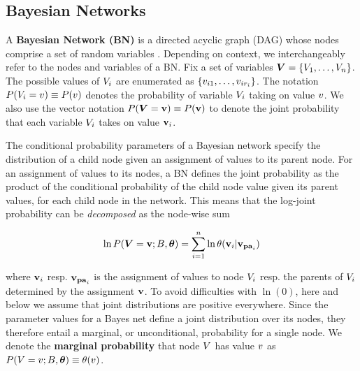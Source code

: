 \documentclass[conference]{IEEEtran}
\begin{document}
 
\subsection{Bayesian Networks}

A {\bf Bayesian Network (BN)} is a directed acyclic graph (DAG) whose nodes comprise a set of random variables \cite{Pearl1988}. Depending on context, we interchangeably refer to the nodes  and variables of a BN. Fix a set of variables $\boldsymbol{V} = \{V_{1},\ldots,V_{n}\}$. 
The possible values of $V_{i}$ are enumerated as $\{v_{i1},\ldots,v_{ir_{i}}\}$. The notation $P(V_{i} = v)\equiv P(v)$ denotes the probability of variable $V_{i}$ taking on value $v$. We also use the vector notation $P(\boldsymbol{V} = \mathbf{v}) \equiv P(\mathbf{v})$ to denote the joint probability that each variable $V_{i}$ takes on value $\mathbf{v}_{i}$. 


The conditional probability parameters of a Bayesian network specify the distribution of a child node given an assignment of values to its parent node. For an assignment of values to its nodes, a BN defines the joint probability as the product of the conditional probability of the child node value given its parent values, for each child node in the network. This means that the log-joint probability can be {\em decomposed} as the node-wise sum

\begin{equation} \label{eq:bn}
\ln P(\Features = \set{\nodevalue};\model,\parameters) = \sum_{i=1}^{n} \ln \parameter(\set{\nodevalue}_{i}|\set{\nodevalue}_{\parents_{i}})
\end{equation}

where $\mathbf{v}_{i}$ resp. $\mathbf{v}_{\mathbf{pa}_{i}}$ is the assignment of values to node $V_{i}$ resp. the parents of $V_{i}$ determined by the assignment $\mathbf{v}$. 
To avoid difficulties with $\ln(0)$, here and below we assume that joint distributions are positive everywhere. Since the parameter values for a Bayes net define a joint distribution over its nodes, they therefore entail a marginal, or unconditional, probability for a single node. We denote the \textbf{marginal probability} that node $V$ has value $v$ as $P(V = v;B,\boldsymbol{\theta}) \equiv \theta(v)$.
\end{document}
